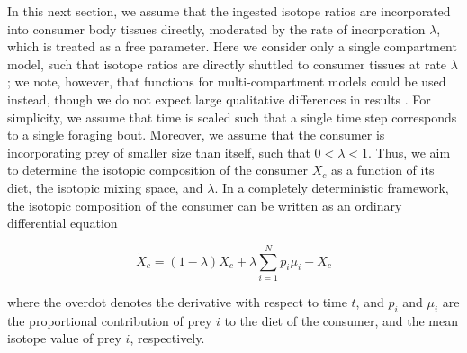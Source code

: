 \documentclass{frontiersSCNS}
\begin{document}
In this next section, we assume that the ingested isotope ratios are incorporated into consumer body tissues directly, moderated by the rate of incorporation $\lambda$, which is treated as a free parameter.
Here we consider only a single compartment model, such that isotope ratios are directly shuttled to consumer tissues at rate $\lambda$; we note, however, that functions for multi-compartment models could be used instead, though we do not expect large qualitative differences in results \citep[cf. Fig. 1 in][]{delRio:2008bs}.
For simplicity, we assume that time is scaled such that a single time step corresponds to a single foraging bout.
Moreover, we assume that the consumer is incorporating prey of smaller size than itself, such that $ 0 < \lambda < 1$.
Thus, we aim to determine the isotopic composition of the consumer $X_c$ as a function of its diet, the isotopic mixing space, and $\lambda$.
In a completely deterministic framework, the isotopic composition of the consumer can be written as an ordinary differential equation

\begin{equation}
\label{eqODE}
\dot X_c = (1-\lambda)X_c + \lambda \sum_{i=1}^N p_i \mu_i - X_c
\end{equation}

\noindent where the overdot denotes the derivative with respect to time $t$, and $p_i$ and $\mu_i$ are the proportional contribution of prey $i$ to the diet of the consumer, and the mean isotope value of prey $i$, respectively.
\end{document}
